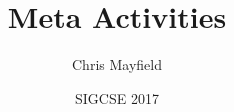 \documentclass[12pt]{article}
\title{Meta Activities}
\author{Chris Mayfield}
\date{SIGCSE 2017}
\begin{document}
\maketitle


\makeatletter
{}
\graphicspath{{../../CS1/Act02/}{../../CS1/Act03/}{../../CS1/Act04/}}
\makeatother


\newpage



\end{document}
